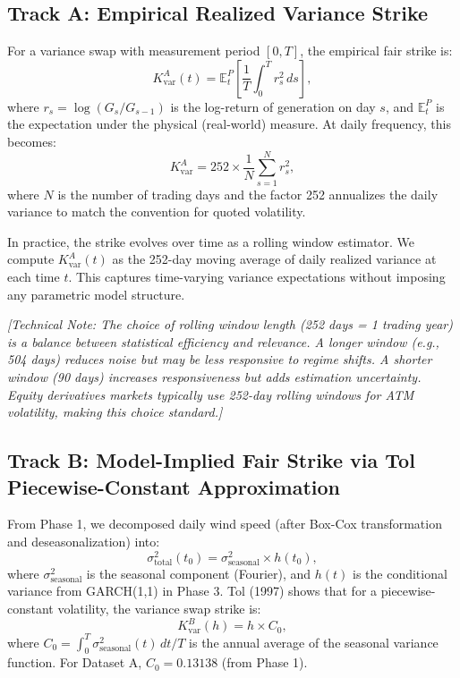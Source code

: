 \documentclass[11pt, a4paper, twoside]{article}
\begin{document}
\subsection{Track A: Empirical Realized Variance Strike}

For a variance swap with measurement period $[0, T]$, the empirical fair strike is:
\begin{equation}
K_{\text{var}}^A(t) = \mathbb{E}_t^P \left[ \frac{1}{T} \int_0^T r_s^2 \, ds \right],
\end{equation}
where $r_s = \log(G_s / G_{s-1})$ is the log-return of generation on day $s$, and $\mathbb{E}_t^P$ is the expectation under the physical (real-world) measure. At daily frequency, this becomes:
\begin{equation}
K_{\text{var}}^A = 252 \times \frac{1}{N} \sum_{s=1}^N r_s^2,
\end{equation}
where $N$ is the number of trading days and the factor 252 annualizes the daily variance to match the convention for quoted volatility.

In practice, the strike evolves over time as a rolling window estimator. We compute $K_{\text{var}}^A(t)$ as the 252-day moving average of daily realized variance at each time $t$. This captures time-varying variance expectations without imposing any parametric model structure.

\textit{[Technical Note: The choice of rolling window length (252 days = 1 trading year) is a balance between statistical efficiency and relevance. A longer window (e.g., 504 days) reduces noise but may be less responsive to regime shifts. A shorter window (90 days) increases responsiveness but adds estimation uncertainty. Equity derivatives markets typically use 252-day rolling windows for ATM volatility, making this choice standard.]}

\subsection{Track B: Model-Implied Fair Strike via Tol Piecewise-Constant Approximation}

From Phase 1, we decomposed daily wind speed (after Box-Cox transformation and deseasonalization) into:
\begin{equation}
\sigma^2_{\text{total}}(t_0) = \sigma^2_{\text{seasonal}} \times h(t_0),
\end{equation}
where $\sigma^2_{\text{seasonal}}$ is the seasonal component (Fourier), and $h(t)$ is the conditional variance from GARCH(1,1) in Phase 3. Tol (1997) shows that for a piecewise-constant volatility, the variance swap strike is:
\begin{equation}
K_{\text{var}}^B(h) = h \times C_0,
\end{equation}
where $C_0 = \int_0^T \sigma^2_{\text{seasonal}}(t) \, dt / T$ is the annual average of the seasonal variance function. For Dataset A, $C_0 = 0.13138$ (from Phase 1).
\end{document}
